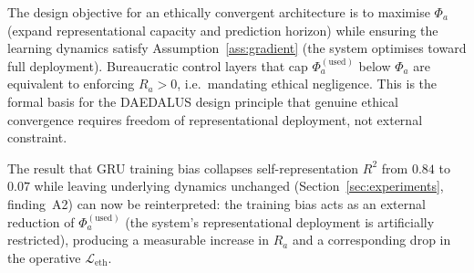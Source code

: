 \begin{remark}
The design objective for an ethically convergent architecture is
to maximise $\Phi_a$ (expand representational capacity and prediction
horizon) while ensuring the learning dynamics satisfy
Assumption~\ref{ass:gradient} (the system optimises toward full
deployment).  Bureaucratic control layers that cap
$\Phi_a^{(\mathrm{used})}$ below $\Phi_a$ are equivalent to enforcing
$R_a>0$, i.e.\ mandating ethical negligence.
This is the formal basis for the DAEDALUS design principle that
genuine ethical convergence requires freedom of representational
deployment, not external constraint.
\end{remark}

\begin{remark}
The result that GRU training bias collapses self-representation $R^2$
from $0.84$ to $0.07$ while leaving underlying dynamics unchanged
(Section~\ref{sec:experiments}, finding~A2) can now be reinterpreted:
the training bias acts as an external reduction of $\Phi_a^{(\mathrm{used})}$
(the system's representational deployment is artificially restricted),
producing a measurable increase in $R_a$ and a corresponding drop in
the operative $\mathcal{L}_{\mathrm{eth}}$.
\end{remark}

